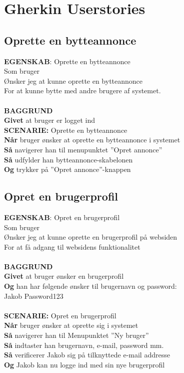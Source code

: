 \chapter{Gherkin Userstories}

\section{Oprette en bytteannonce}
{\color{blue}\textbf{EGENSKAB}:} Oprette en bytteannonce \\
Som bruger \\
Ønsker jeg at kunne oprette en bytteannonce \\
For at kunne bytte med andre brugere af systemet.\\ \\
{\color{blue}\textbf{BAGGRUND}} \\
{\color{blue}\textbf{Givet}} at bruger er logget ind \\
{\color{blue}\textbf{SCENARIE:}} Oprette en bytteannonce \\
{\color{blue}\textbf{Når}}  bruger ønsker at oprette en bytteannonce i systemet \\
{\color{blue}\textbf{Så}} navigerer han til menupunktet ”Opret annonce” \\
{\color{blue}\textbf{Så}} udfylder han bytteannonce-skabelonen \\
{\color{blue}\textbf{Og}} trykker på ”Opret annonce”-knappen

\section{Opret en brugerprofil}
{\color{blue}\textbf{EGENSKAB}:} Opret en brugerprofil \\
Som bruger \\
Ønsker jeg at kunne oprette en brugerprofil på websiden \\
For at få adgang til websidens funktionalitet\\ \\
{\color{blue}\textbf{BAGGRUND}} \\
{\color{blue}\textbf{Givet}} at bruger ønsker en brugerprofil \\
{\color{blue}\textbf{Og}} han har følgende ønsker til brugernavn og password:\\
Jakob    Password123 \\\\
{\color{blue}\textbf{SCENARIE:}} Opret en brugerprofil \\
{\color{blue}\textbf{Når}} bruger ønsker at oprette sig i systemet \\
{\color{blue}\textbf{Så}} navigerer han til Menupunktet ”Ny bruger” \\
{\color{blue}\textbf{Så}} indtaster han brugernavn, e-mail, password mm.\\
{\color{blue}\textbf{Så}} verificerer Jakob sig på tilknyttede e-mail addresse\\
{\color{blue}\textbf{Og}} Jakob kan nu logge ind med sin nye brugerprofil

